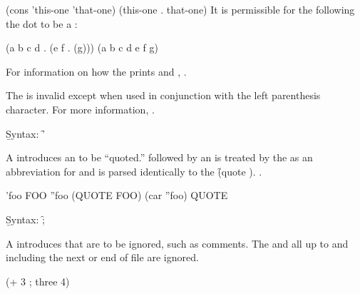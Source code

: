 \code
 (cons 'this-one 'that-one) \EV (this-one . that-one)
\endcode
It is permissible for the  
following the dot to be a :

\code
 (a b c d . (e f . (g))) \EQ (a b c d e f g)
\endcode

For information on how the  prints  and ,
\seesection\PrintingListsAndConses.

\endsubsection%



The  is invalid 
except when used in conjunction with the left parenthesis character.
For more information, \seesection\ReaderAlgorithm.

\endsubsection%


\b{Syntax:}  \f{'}


A  introduces an  to be ``quoted.''
 followed by an   
is treated by the  as an abbreviation for
and is parsed identically to the  \f{(quote )}.
.


\code
 'foo \EV FOO
 ''foo \EV (QUOTE FOO)
 (car ''foo) \EV QUOTE
\endcode

\endsubsubsection%

\endsubsection%


\b{Syntax:} \f{;}


A  introduces  that are to be ignored,
such as comments.  The  and all  up to
and including the next  or end of file are ignored.


\code
 (+ 3 ; three
    4)
\endcode

\endsubsubsection%


